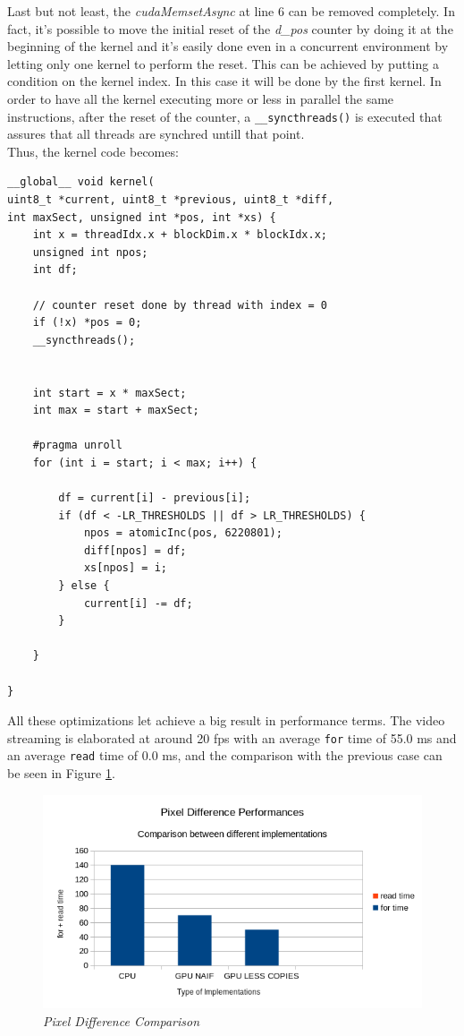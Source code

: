 \documentclass[paper=a4, fontsize=10pt]{scrartcl}	%
\begin{document}
	Last but not least, the \textit{cudaMemsetAsync} at line 6 can be removed completely. In fact, it's possible to move the initial reset of the \textit{d\_pos} counter by doing it at the beginning of the kernel and it's easily done even in a concurrent environment by letting only one kernel to perform the reset. This can be achieved by putting a condition on the kernel index. In this case it will be done by the first kernel. In order to have all the kernel executing more or less in parallel the same instructions, after the reset of the counter, a \texttt{\_\_syncthreads()} is executed that assures that all threads are synchred untill that point. \\

	Thus, the kernel code becomes:

	\begin{lstlisting}[style=CStyle]
__global__ void kernel(
uint8_t *current, uint8_t *previous, uint8_t *diff, 
int maxSect, unsigned int *pos, int *xs) {
	int x = threadIdx.x + blockDim.x * blockIdx.x;
	unsigned int npos;
	int df;

	// counter reset done by thread with index = 0
	if (!x) *pos = 0;
	__syncthreads();


	int start = x * maxSect;
	int max = start + maxSect;

	#pragma unroll
	for (int i = start; i < max; i++) {

		df = current[i] - previous[i];
		if (df < -LR_THRESHOLDS || df > LR_THRESHOLDS) {
			npos = atomicInc(pos, 6220801);
			diff[npos] = df;
			xs[npos] = i;
		} else {
			current[i] -= df;
		}

	}

}
	\end{lstlisting}

	All these optimizations let achieve a big result in performance terms. The video streaming is elaborated at around 20 fps with an average \texttt{for} time of 55.0 ms and an average \texttt{read} time of 0.0 ms, and the comparison with the previous case can be seen in Figure \ref{fig:chart3}. 

	\begin{figure}[H]
		\centering
		\includegraphics[width=0.8\linewidth]{images/chart3.png}
		\caption{\textit{Pixel Difference Comparison}}
		\label{fig:chart3}
	\end{figure}
\end{document}
